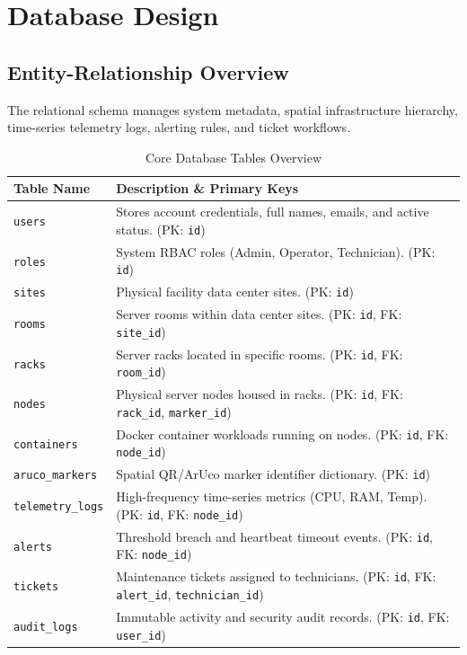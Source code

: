 \section{Database Design}

\subsection{Entity-Relationship Overview}
The relational schema manages system metadata, spatial infrastructure hierarchy, time-series telemetry logs, alerting rules, and ticket workflows.

\begin{table}[H]
    \centering
    \caption{Core Database Tables Overview}
    \begin{tabular}{|l|p{11cm}|}
        \hline
        \textbf{Table Name} & \textbf{Description \& Primary Keys} \\ \hline
        \texttt{users} & Stores account credentials, full names, emails, and active status. (PK: \texttt{id}) \\ \hline
        \texttt{roles} & System RBAC roles (Admin, Operator, Technician). (PK: \texttt{id}) \\ \hline
        \texttt{sites} & Physical facility data center sites. (PK: \texttt{id}) \\ \hline
        \texttt{rooms} & Server rooms within data center sites. (PK: \texttt{id}, FK: \texttt{site\_id}) \\ \hline
        \texttt{racks} & Server racks located in specific rooms. (PK: \texttt{id}, FK: \texttt{room\_id}) \\ \hline
        \texttt{nodes} & Physical server nodes housed in racks. (PK: \texttt{id}, FK: \texttt{rack\_id}, \texttt{marker\_id}) \\ \hline
        \texttt{containers} & Docker container workloads running on nodes. (PK: \texttt{id}, FK: \texttt{node\_id}) \\ \hline
        \texttt{aruco\_markers} & Spatial QR/ArUco marker identifier dictionary. (PK: \texttt{id}) \\ \hline
        \texttt{telemetry\_logs} & High-frequency time-series metrics (CPU, RAM, Temp). (PK: \texttt{id}, FK: \texttt{node\_id}) \\ \hline
        \texttt{alerts} & Threshold breach and heartbeat timeout events. (PK: \texttt{id}, FK: \texttt{node\_id}) \\ \hline
        \texttt{tickets} & Maintenance tickets assigned to technicians. (PK: \texttt{id}, FK: \texttt{alert\_id}, \texttt{technician\_id}) \\ \hline
        \texttt{audit\_logs} & Immutable activity and security audit records. (PK: \texttt{id}, FK: \texttt{user\_id}) \\ \hline
    \end{tabular}
\end{table}

